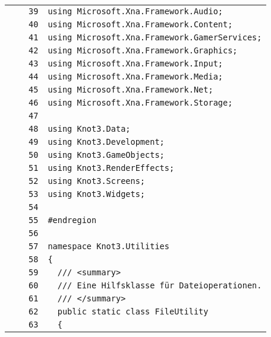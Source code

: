 \documentclass[a4paper,10pt]{article}
\begin{document}
\begin{longtable}[l]{lrrl}
\cellcolor{gray} &  & \verb~39~ & \verb~using Microsoft.Xna.Framework.Audio;~\\
\cellcolor{gray} &  & \verb~40~ & \verb~using Microsoft.Xna.Framework.Content;~\\
\cellcolor{gray} &  & \verb~41~ & \verb~using Microsoft.Xna.Framework.GamerServices;~\\
\cellcolor{gray} &  & \verb~42~ & \verb~using Microsoft.Xna.Framework.Graphics;~\\
\cellcolor{gray} &  & \verb~43~ & \verb~using Microsoft.Xna.Framework.Input;~\\
\cellcolor{gray} &  & \verb~44~ & \verb~using Microsoft.Xna.Framework.Media;~\\
\cellcolor{gray} &  & \verb~45~ & \verb~using Microsoft.Xna.Framework.Net;~\\
\cellcolor{gray} &  & \verb~46~ & \verb~using Microsoft.Xna.Framework.Storage;~\\
\cellcolor{gray} &  & \verb~47~ & \verb~~\\
\cellcolor{gray} &  & \verb~48~ & \verb~using Knot3.Data;~\\
\cellcolor{gray} &  & \verb~49~ & \verb~using Knot3.Development;~\\
\cellcolor{gray} &  & \verb~50~ & \verb~using Knot3.GameObjects;~\\
\cellcolor{gray} &  & \verb~51~ & \verb~using Knot3.RenderEffects;~\\
\cellcolor{gray} &  & \verb~52~ & \verb~using Knot3.Screens;~\\
\cellcolor{gray} &  & \verb~53~ & \verb~using Knot3.Widgets;~\\
\cellcolor{gray} &  & \verb~54~ & \verb~~\\
\cellcolor{gray} &  & \verb~55~ & \verb~#endregion~\\
\cellcolor{gray} &  & \verb~56~ & \verb~~\\
\cellcolor{gray} &  & \verb~57~ & \verb~namespace Knot3.Utilities~\\
\cellcolor{gray} &  & \verb~58~ & \verb~{~\\
\cellcolor{gray} &  & \verb~59~ & \verb~  /// <summary>~\\
\cellcolor{gray} &  & \verb~60~ & \verb~  /// Eine Hilfsklasse für Dateioperationen.~\\
\cellcolor{gray} &  & \verb~61~ & \verb~  /// </summary>~\\
\cellcolor{gray} &  & \verb~62~ & \verb~  public static class FileUtility~\\
\cellcolor{gray} &  & \verb~63~ & \verb~  {~\\

\end{longtable}
\end{document}
